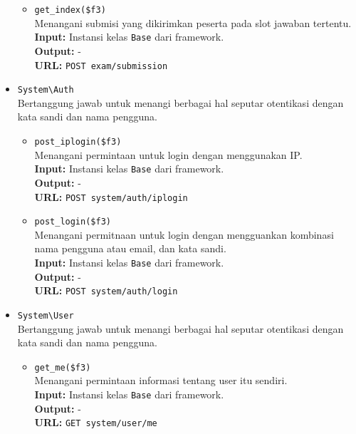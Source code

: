\begin{itemize}
\begin{itemize}
                \item \texttt{get\_index(\$f3)} \\
                    Menangani submisi yang dikirimkan peserta pada slot jawaban
                    tertentu. \textbf{Input:} Instansi kelas \texttt{Base} dari
                    framework.\\
                    \textbf{Output:} -\\
                    \textbf{URL:} \texttt{POST exam/submission}
            \end{itemize}
            
        \item \texttt{System\textbackslash Auth} \\
            Bertanggung jawab untuk menangi berbagai hal seputar otentikasi
            dengan kata sandi dan nama pengguna.
            \begin{itemize}
                \item \texttt{post\_iplogin(\$f3)}\\
                    Menangani permintaan untuk login dengan menggunakan IP.\\
                    \textbf{Input:} Instansi kelas \texttt{Base} dari
                    framework.\\
                    \textbf{Output:} -\\
                    \textbf{URL:} \texttt{POST system/auth/iplogin}
                
                \item \texttt{post\_login(\$f3)}\\
                    Menangani permitnaan untuk login dengan mengguankan
                    kombinasi nama pengguna atau email, dan kata sandi.\\
                    \textbf{Input:} Instansi kelas \texttt{Base} dari
                    framework.\\
                    \textbf{Output:} -\\
                    \textbf{URL:} \texttt{POST system/auth/login}
            \end{itemize}

        \item \texttt{System\textbackslash User} \\
            Bertanggung jawab untuk menangi berbagai hal seputar otentikasi
            dengan kata sandi dan nama pengguna.
            \begin{itemize}
                \item \texttt{get\_me(\$f3)}\\
                    Menangani permintaan informasi tentang user itu sendiri.\\
                    \textbf{Input:} Instansi kelas \texttt{Base} dari
                    framework.\\
                    \textbf{Output:} -\\
                    \textbf{URL:} \texttt{GET system/user/me}
                

\end{itemize}
\end{itemize}

